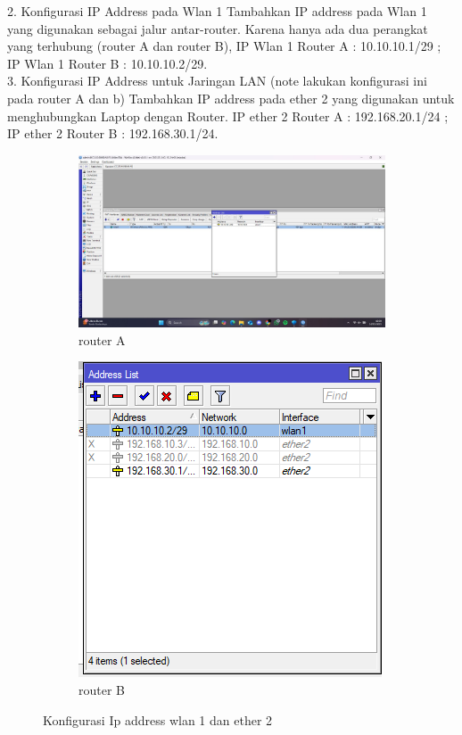 2. Konfigurasi IP Address pada Wlan 1 Tambahkan IP address pada Wlan 1 yang digunakan sebagai jalur antar-router. Karena hanya ada dua perangkat yang terhubung (router A dan router B), IP Wlan 1 Router A : 10.10.10.1/29 ; IP Wlan 1 Router B : 10.10.10.2/29. \\
3. Konfigurasi IP Address untuk Jaringan LAN (note lakukan konfigurasi ini pada router A dan b) Tambahkan IP address pada ether 2 yang digunakan untuk menghubungkan Laptop dengan Router. IP ether 2 Router A : 192.168.20.1/24 ; IP ether 2 Router B : 192.168.30.1/24.
\begin{figure}[H]
    \centering
    \begin{subfigure}[b]{0.3\linewidth}
      \centering
      \includegraphics[width=\linewidth]{image/bridge4.jpg}
      \caption{router A}
    \end{subfigure}
    \hspace{1cm}
    \begin{subfigure}[b]{0.3\linewidth}
      \centering
      \includegraphics[width=\linewidth]{image/bridge1.png}
      \caption{router B}
    \end{subfigure}
    \caption{Konfigurasi Ip address wlan 1 dan ether 2}
\end{figure}

